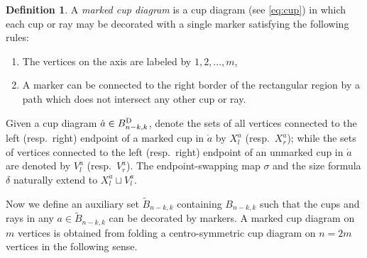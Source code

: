 \documentclass[11pt,reqno]{amsart}
\numberwithin{equation}{section}
\theoremstyle{definition}
\newtheorem{definition}[theorem]{Definition}
\newcommand{\BD}{{B}^\textup{D}}
\newcommand{\da}{\dot{a}}
\newcommand{\tB}{\widetilde{B}}
\begin{document}
\begin{definition}
A {\it marked cup diagram} is a cup diagram (see \eqref{eq:cup}) in which each cup or ray may be decorated with a single marker satisfying the following rules:
\begin{enumerate}[($M1$)]
\item 
The vertices on the axis are labeled by $1, 2, \ldots, m$,
\item
A marker can be connected to the right border  of the rectangular region by a path which does not intersect any other cup or ray.  
\end{enumerate}
Given a cup diagram $\da\in \BD_{n-k,k}$,
 denote the sets of all vertices connected to the left (resp.\ right) endpoint of a marked cup in $\da$ by $X_l^{\da}$ (resp.\ $X_r^{\da}$); while the sets of vertices connected to the left (resp.\ right) endpoint of an unmarked cup in $\da$ are denoted by
$V_l^{\da}$ (resp.\ $V_r^{\da}$).
The endpoint-swapping map $\sigma$ and the size formula $\delta$ naturally extend to $X_l^{\da} \sqcup V_l^{\da}$.

Now we define an auxiliary  set $\tB_{n-k,k}$ containing $B_{n-k,k}$ such that the cups and rays in any $a \in \tB_{n-k,k}$ can be decorated by markers.
A marked cup diagram on $m$ vertices 
is obtained from folding a centro-symmetric cup diagram on $n = 2m$ vertices in the following sense.



\end{definition}
\end{document}
